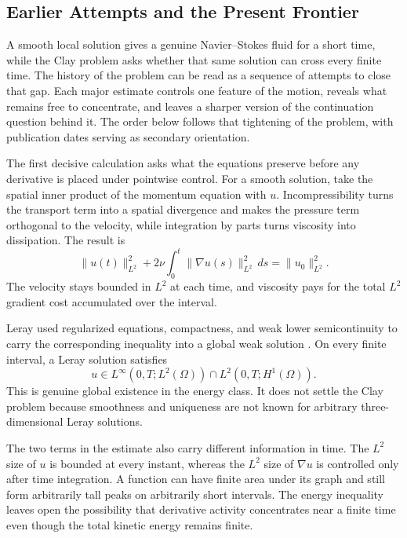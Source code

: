 \subsection{Earlier Attempts and the Present Frontier}\label{sub:HistoricalEstimates}

A smooth local solution gives a genuine Navier--Stokes fluid for a short time, while the Clay problem asks whether that same solution can cross every finite time.
The history of the problem can be read as a sequence of attempts to close that gap.
Each major estimate controls one feature of the motion, reveals what remains free to concentrate, and leaves a sharper version of the continuation question behind it.
The order below follows that tightening of the problem, with publication dates serving as secondary orientation.


The first decisive calculation asks what the equations preserve before any derivative is placed under pointwise control.
For a smooth solution, take the spatial inner product of the momentum equation with \(u\).
Incompressibility turns the transport term into a spatial divergence and makes the pressure term orthogonal to the velocity, while integration by parts turns viscosity into dissipation.
The result is
\[
  \lVert u(t)\rVert_{L^2}^{2}
  +2\nu\int_0^t\lVert\nabla u(s)\rVert_{L^2}^{2}\,ds
  =
  \lVert u_0\rVert_{L^2}^{2}.
\]
The velocity stays bounded in \(L^2\) at each time, and viscosity pays for the total \(L^2\) gradient cost accumulated over the interval.

Leray used regularized equations, compactness, and weak lower semicontinuity to carry the corresponding inequality into a global weak solution \parencite{Leray1934}.
On every finite interval, a Leray solution satisfies
\[
  u\in L^\infty(0,T;L^2(\Omega))
  \cap
  L^2(0,T;H^1(\Omega)).
\]
This is genuine global existence in the energy class.
It does not settle the Clay problem because smoothness and uniqueness are not known for arbitrary three-dimensional Leray solutions.

The two terms in the estimate also carry different information in time.
The \(L^2\) size of \(u\) is bounded at every instant, whereas the \(L^2\) size of \(\nabla u\) is controlled only after time integration.
A function can have finite area under its graph and still form arbitrarily tall peaks on arbitrarily short intervals.
The energy inequality leaves open the possibility that derivative activity concentrates near a finite time even though the total kinetic energy remains finite.

